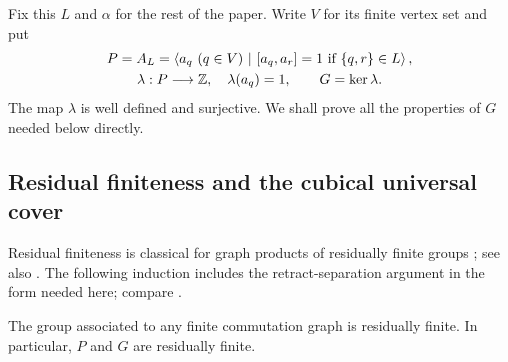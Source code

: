Fix this $L$ and $\alpha$ for the rest of the paper.  Write $V$ for
its finite vertex set and put
\begin{equation}\label{eq:height-kernel}
 \begin{gathered}
 P=A_L=
 \left\langle a_q\ (q\in V)\ \middle|\
 [a_q,a_r]=1\text{ if }\{q,r\}\in L\right\rangle,
 \\
 \lambda:P\longrightarrow\mathbb Z,\quad \lambda(a_q)=1,
 \qquad G=\ker\lambda.
 \end{gathered}
\end{equation}
The map $\lambda$ is well defined and surjective.  We shall prove all
the properties of $G$ needed below directly.

\subsection{Residual finiteness and the cubical universal cover}

Residual finiteness is classical for graph products of residually finite
groups \cite[Corollary~5.4]{Green1990}; see also
\cite[Theorem~3.7]{HsuWise1999}. The following induction includes the
retract-separation argument in the form needed here; compare
\cite[Lemma~3.9(1)]{HsuWise1999}.

\begin{lemma}\label{lem:graph-group-rf}
The group associated to any finite commutation graph is residually
finite.  In particular, $P$ and $G$ are residually finite.
\end{lemma}

